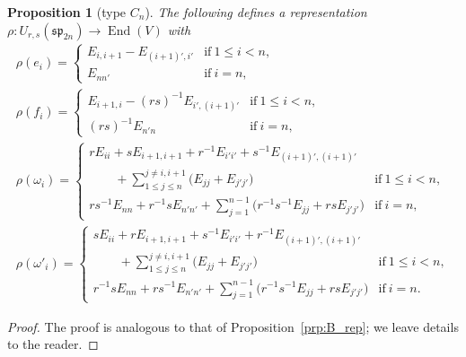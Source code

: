 \documentclass[10pt,a4paper]{amsart}
\numberwithin{equation}{section}
\newtheorem{Proposition}[Theorem]{Proposition}
 { \theoremstyle{definition}
\newtheorem{Definition}[Theorem]{Definition}
\newtheorem{Note}[Theorem]{Note}
\newtheorem{Example}[Theorem]{Example}
\newtheorem{Remark}[Theorem]{Remark} }
\DeclareMathOperator{\End}{End}
\newcommand{\ssp}{\mathfrak{sp}}
\begin{document}
\begin{Proposition}[type $C_n$]\label{prp:C_rep}
The following defines a representation $\rho\colon  U_{r,s}(\ssp_{2n})\to \End(V)$ with
\begin{gather*}
 \rho(e_{i}) =
 \begin{cases}
 E_{i,i + 1} - E_{(i + 1)',i'} & \mathrm{if}\ 1\leq i<n ,\\
 E_{nn'} & \mathrm{if}\ i=n,
 \end{cases} \\
 \rho(f_{i}) =
 \begin{cases}
 E_{i+ 1,i} - (rs)^{-1}E_{i',(i + 1)'} & \mathrm{if}\ 1\leq i<n ,\\
 (rs)^{-1}E_{n'n} & \mathrm{if}\ i=n ,
 \end{cases} \\
 \rho(\omega_{i}) =
 \begin{cases}
 \displaystyle rE_{ii} + sE_{i + 1, i+1} + r^{-1}E_{i'i'} + s^{-1}E_{(i +1)',(i+1)'} \\
 \displaystyle\qquad{} + \sum_{1\leq j\leq n}^{j \neq i,i + 1} \bigl(E_{jj} + E_{j'j'}\bigr)
 & \mathrm{if}\ 1\leq i<n ,\\
 \displaystyle{rs^{-1}E_{nn} + r^{-1}sE_{n'n'} + \sum_{j = 1}^{n-1}\bigl(r^{-1}s^{-1}E_{jj} + rsE_{j'j'}\bigr)}
 & \mathrm{if}\ i = n,
 \end{cases} \\
 \rho(\omega'_{i}) =
 \begin{cases}
 \displaystyle sE_{ii} + rE_{i + 1, i+1} + s^{-1}E_{i'i'} + r^{-1}E_{(i +1)',(i+1)'} \\
 \displaystyle \qquad{} + \sum_{1\leq j\leq n}^{j \neq i,i + 1} \bigl(E_{jj} + E_{j'j'}\bigr)
 & \mathrm{if}\ 1\leq i<n, \\
 \displaystyle{r^{-1}sE_{nn} + rs^{-1}E_{n'n'} + \sum_{j = 1}^{n-1}\bigl(r^{-1}s^{-1}E_{jj} + rsE_{j'j'}\bigr)}
 & \mathrm{if}\ i = n.
\end{cases}
\end{gather*}
\end{Proposition}


\begin{proof}
The proof is analogous to that of Proposition~\ref{prp:B_rep}; we leave details to the reader.
\end{proof}
\end{document}
